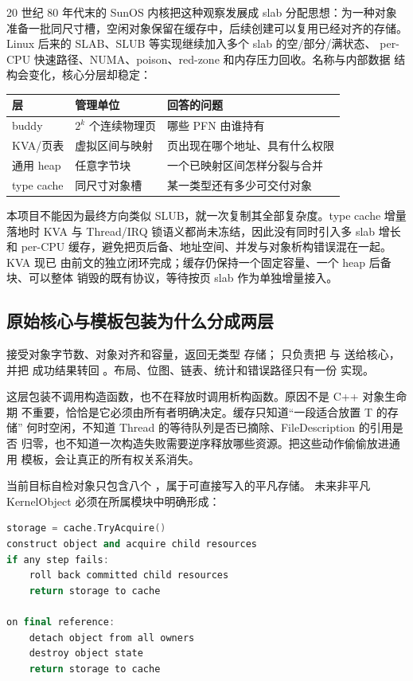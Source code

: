 20 世纪 80 年代末的 SunOS 内核把这种观察发展成 slab 分配思想：为一种对象
准备一批同尺寸槽，空闲对象保留在缓存中，后续创建可以复用已经对齐的存储。
Linux 后来的 SLAB、SLUB 等实现继续加入多个 slab 的空/部分/满状态、
per-CPU 快速路径、NUMA、poison、red-zone 和内存压力回收。名称与内部数据
结构会变化，核心分层却稳定：

\begin{center}
\begin{tabular}{lll}
\toprule
层 & 管理单位 & 回答的问题\\
\midrule
buddy & \(2^k\) 个连续物理页 & 哪些 PFN 由谁持有\\
KVA/页表 & 虚拟区间与映射 & 页出现在哪个地址、具有什么权限\\
通用 heap & 任意字节块 & 一个已映射区间怎样分裂与合并\\
type cache & 同尺寸对象槽 & 某一类型还有多少可交付对象\\
\bottomrule
\end{tabular}
\end{center}

本项目不能因为最终方向类似 SLUB，就一次复制其全部复杂度。type cache 增量
落地时 KVA 与 Thread/IRQ 锁语义都尚未冻结，因此没有同时引入多 slab 增长和
per-CPU 缓存，避免把页后备、地址空间、并发与对象析构错误混在一起。KVA 现已
由前文的独立闭环完成；缓存仍保持一个固定容量、一个 heap 后备块、可以整体
销毁的既有协议，等待按页 slab 作为单独增量接入。

\subsection{原始核心与模板包装为什么分成两层}

 接受对象字节数、对象对齐和容量，返回无类型
存储； 只负责把
 与  送给核心，并把
成功结果转回 。布局、位图、链表、统计和错误路径只有一份
实现。

这层包装不调用构造函数，也不在释放时调用析构函数。原因不是 C++ 对象生命期
不重要，恰恰是它必须由所有者明确决定。缓存只知道“一段适合放置 T 的存储”
何时空闲，不知道 Thread 的等待队列是否已摘除、FileDescription 的引用是否
归零，也不知道一次构造失败需要逆序释放哪些资源。把这些动作偷偷放进通用
模板，会让真正的所有权关系消失。

当前目标自检对象只包含八个 ，属于可直接写入的平凡存储。
未来非平凡 KernelObject 必须在所属模块中明确形成：

\begin{lstlisting}[language=C++]
storage = cache.TryAcquire()
construct object and acquire child resources
if any step fails:
    roll back committed child resources
    return storage to cache

on final reference:
    detach object from all owners
    destroy object state
    return storage to cache
\end{lstlisting}

